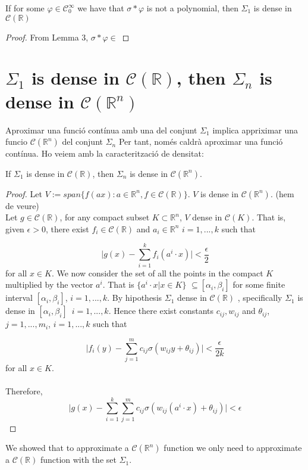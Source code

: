 \documentclass[../main.tex]{subfiles}
\begin{document}
	\begin{lema} %
		If for some $\varphi \in \mathcal{C}^\infty_0 $ we have that $\sigma \ast \varphi $ is not a polynomial, then $\Sigma_1$ is dense in $\mathcal{C}(\mathbb{R})$
	\end{lema}
	 \begin{proof}
	 From Lemma 3, $\sigma \ast \varphi \in$
	 \end{proof}
 \section{{$\Sigma_1$ is dense in $\mathcal{C}(\mathbb{R})$, then $\Sigma_n$ is dense in $\mathcal{C}(\mathbb{R}^n)$ }}
 Aproximar una funció contínua amb una del conjunt $\Sigma_1$ implica appriximar una funcio $\mathcal{C}(\mathbb{R}^n)$ del conjunt $\Sigma_n $ Per tant, només caldrà aproximar una funció contínua. Ho veiem amb la caracterització de densitat: 
	\begin{lema}  %
			If $\Sigma_1$ is dense in $\mathcal{C}(\mathbb{R})$, then $\Sigma_n$ is dense in $\mathcal{C}(\mathbb{R}^n)$. 
		\end{lema}
	
	\begin{proof} %
			Let $V:= span\{ f(ax) : a \in \mathbb{R}^n, f \in \mathcal{C}(\mathbb{R}) \}$. $V$ is dense in $\mathcal{C}(\mathbb{R}^n)$. (hem de veure) \\ 
			Let $g\in \mathcal{C}(\mathbb{R}) $, for any compact subset $K \subset \mathbb{R}^n  $, $V$ dense in $\mathcal{C}(K)$. That is, given $\epsilon >0$, there exist $f_i\in  \mathcal{C}(\mathbb{R})$ and $a_i \in \mathbb{R}^n $    {\scriptsize $i=1,...,k$}  such that
			
			$$ \big| g(x)-\sum_{i=1}^k f_i(a^i \cdot x) \big| < \frac{\epsilon}{2}$$
			for all $x\in K$. We now consider the set of all the points in the compact $K$ multiplied by the vector $a^i$. That is $\{a^i \cdot x | x \in K\}$ $\subseteq[\alpha_i,\beta_i] $ for some finite interval $[\alpha_i,\beta_i]$, $i=1,...,k$. By hipothesis $\Sigma_1 $ dense in $\mathcal{C}(\mathbb{R})$ , specifically $\Sigma_1 $ is dense in $[\alpha_i,\beta_i ]$ $ \, i=1,...,k$. Hence there exist constants $c_{ij}, w_{ij}$ and $\theta_{ij}$, $j=1,...,m_i$, $i=1,...,k$ such that 
			
			$$ \big| f_i(y) - \sum_{j=1}^{m} c_{ij} \sigma(w_{ij}y+ \theta_{ij})\big| < \frac{\epsilon}{2k}$$
			for all $x\in K$. \\ \\
			Therefore, 
			$$ \big| g(x) - \sum_{i=1}^k \sum_{j=1}^m c_{ij} \sigma(w_{ij}(a^i \cdot x) + \theta_{ij})  \big| < \epsilon$$
		\end{proof}
	We showed that to approximate a $\mathcal{C}(\mathbb{R}^n)$ function we only need to approximate a $\mathcal{C} (\mathbb{R})$ function with the set $\Sigma_1$. 
\end{document}
